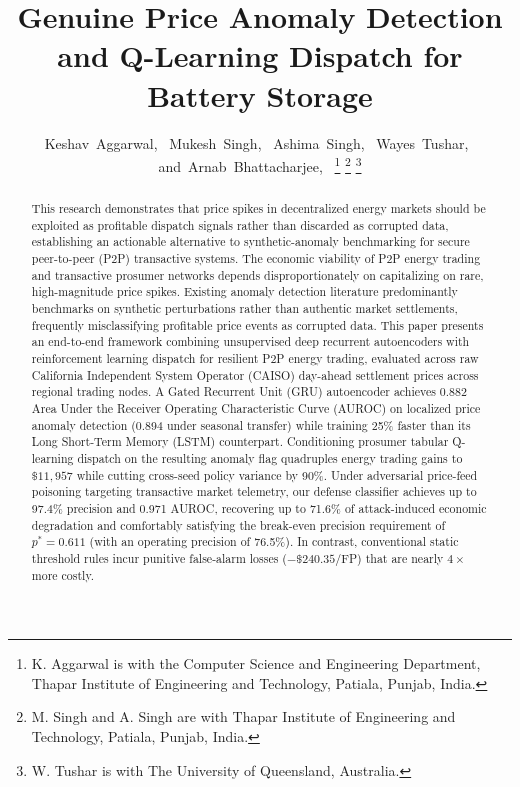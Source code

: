 \documentclass[journal]{IEEEtran}
\begin{document}
\title{Genuine Price Anomaly Detection and Q-Learning Dispatch for Battery Storage}

\author{Keshav~Aggarwal,~
Mukesh~Singh,~
Ashima~Singh,~
Wayes~Tushar,~
and~Arnab~Bhattacharjee,~%
\thanks{K. Aggarwal is with the Computer Science and Engineering Department, Thapar Institute of Engineering and Technology, Patiala, Punjab, India.}%
\thanks{M. Singh and A. Singh are with Thapar Institute of Engineering and Technology, Patiala, Punjab, India.}%
\thanks{W. Tushar is with The University of Queensland, Australia.}%
}

\maketitle

\begin{abstract}
This research demonstrates that price spikes in decentralized energy markets should be exploited as profitable dispatch signals rather than discarded as corrupted data, establishing an actionable alternative to synthetic-anomaly benchmarking for secure peer-to-peer (P2P) transactive systems.
The economic viability of P2P energy trading and transactive prosumer networks depends disproportionately on capitalizing on rare, high-magnitude price spikes.
Existing anomaly detection literature predominantly benchmarks on synthetic perturbations rather than authentic market settlements, frequently misclassifying profitable price events as corrupted data.
This paper presents an end-to-end framework combining unsupervised deep recurrent autoencoders with reinforcement learning dispatch for resilient P2P energy trading, evaluated across raw California Independent System Operator (CAISO) day-ahead settlement prices across regional trading nodes.
A Gated Recurrent Unit (GRU) autoencoder achieves 0.882 Area Under the Receiver Operating Characteristic Curve (AUROC) on localized price anomaly detection (0.894 under seasonal transfer) while training 25\% faster than its Long Short-Term Memory (LSTM) counterpart.
Conditioning prosumer tabular Q-learning dispatch on the resulting anomaly flag quadruples energy trading gains to $\$11,957$ while cutting cross-seed policy variance by 90\%.
Under adversarial price-feed poisoning targeting transactive market telemetry, our defense classifier achieves up to 97.4\% precision and 0.971 AUROC, recovering up to 71.6\% of attack-induced economic degradation and comfortably satisfying the break-even precision requirement of $p^* = 0.611$ (with an operating precision of 76.5\%). In contrast, conventional static threshold rules incur punitive false-alarm losses ($-\$240.35$/FP) that are nearly $4\times$ more costly.
\end{abstract}
\end{document}
